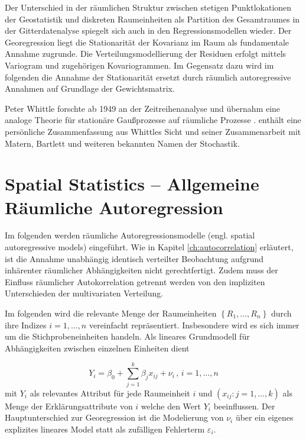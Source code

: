 Der Unterschied in der räumlichen Struktur zwischen stetigen Punktlokationen der Geostatistik und 
diskreten Raumeinheiten als Partition des Gesamtraumes in der Gitterdatenalyse spiegelt sich auch in den Regressionsmodellen wieder. 
Der Georegression liegt die Stationarität der Kovarianz im Raum als fundamentale Annahme zugrunde. 
Die Verteilungsmodellierung der Residuen erfolgt mittels Variogram und zugehörigen Kovariogrammen.
Im Gegensatz dazu wird im folgenden die Annahme der Stationarität ersetzt durch 
räumlich autoregressive Annahmen auf Grundlage der Gewichtsmatrix. 

Peter Whittle forschte ab 1949 an der Zeitreihenanalyse und übernahm eine analoge 
Theorie für stationäre Gaußprozesse auf räumliche Prozesse \cite{whittle_stationary_1954}. \cite[S. 187]{gani_craft_1986} enthält eine 
persönliche Zusammenfassung aus Whittles Sicht und seiner Zusammenarbeit mit Matern, Bartlett und weiteren bekannten
Namen der Stochastik.

\section{Spatial Statistics – Allgemeine Räumliche Autoregression}

Im folgenden werden räumliche Autoregressionsmodelle (engl. spatial autoregressive models) eingeführt. 
Wie in Kapitel \ref{ch:autocorrelation} erläutert, ist die Annahme unabhängig identisch verteilter Beobachtung aufgrund 
inhärenter räumlicher Abhängigkeiten nicht gerechtfertigt. 
Zudem muss der Einfluss räumlicher Autokorrelation getrennt werden von den impliziten Unterschieden der multivariaten Verteilung.

Im folgenden wird die relevante Menge der Raumeinheiten $\left\{ R_1,\ldots,R_n \right\}$ durch ihre 
Indizes $i=1,\ldots,n$ vereinfacht repräsentiert. Insbesondere wird es sich immer um 
die Stichprobeneinheiten handeln. Als lineares Grundmodell für Abhängigkeiten zwischen einzelnen Einheiten dient

\begin{equation} \label{eq-6.1:reg-mod-gen}
    Y_{i}=\beta_{0}+\sum_{j=1}^{k} \beta_{j} x_{ij} +\nu_{i} \, , \, i=1,\ldots,n
\end{equation}
mit $Y_i$ als relevantes Attribut für jede Raumeinheit $i$ und $(x_{ij}:j=1,\ldots ,k)$ als Menge der
Erklärungsattribute von $i$ welche den Wert $Y_{i}$ beeinflussen. Der Hauptunterschied zur Georegression ist
die Modelierung von $\nu_{i}$ über ein eigenes explizites lineares Model statt als zufälligen Fehlerterm $\varepsilon_{i}$.

